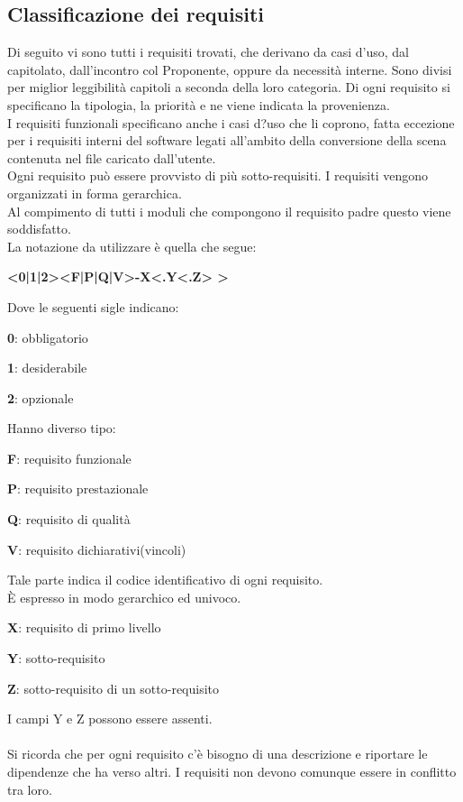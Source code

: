 \documentclass[12pt,a4paper,titlepage]{article}
\begin{document}
	\subsection{Classificazione dei requisiti}
	Di seguito vi sono tutti i requisiti trovati, che derivano da casi d'uso, dal capitolato, dall'incontro col Proponente, oppure da necessità interne. Sono divisi per miglior leggibilità capitoli a seconda della loro categoria. Di ogni requisito si specificano la tipologia, la priorità e ne viene indicata la provenienza. \\
	I requisiti funzionali specificano anche i casi d?uso che li coprono, fatta eccezione per i requisiti interni del software legati all'ambito della conversione della scena contenuta nel file caricato dall'utente. \\
	Ogni requisito può essere provvisto di più sotto-requisiti. I requisiti vengono organizzati in forma gerarchica.\\
	Al compimento di tutti i moduli che compongono il requisito padre questo viene soddisfatto.\\
	La notazione da utilizzare è quella che segue:
	\begin{center}
		\textbf{ <0|1|2><F|P|Q|V>-X<.Y<.Z> > }
	\end{center}
	Dove le seguenti sigle indicano:
	\begin{trivlist}
		\item \textbf{0}: obbligatorio
		\item \textbf{1}: desiderabile
		\item \textbf{2}: opzionale
	\end{trivlist} 
	Hanno diverso tipo:
	\begin{trivlist}
		\item \textbf{F}: requisito funzionale
		\item \textbf{P}: requisito prestazionale
		\item \textbf{Q}: requisito di qualità
		\item \textbf{V}: requisito dichiarativi(vincoli)
	\end{trivlist} 
	Tale parte indica il codice identificativo di ogni requisito.\\
	È espresso in modo gerarchico ed univoco.
	\begin{trivlist}
		\item \textbf{X}: requisito di primo livello
		\item \textbf{Y}: sotto-requisito
		\item \textbf{Z}: sotto-requisito di un sotto-requisito
	\end{trivlist} 
	I campi Y e Z possono essere assenti.\\
	\\
	Si ricorda che per ogni requisito c'è bisogno di una descrizione e riportare le dipendenze che ha verso altri. I requisiti non devono comunque essere in conflitto tra loro.
	\newpage
\end{document}
